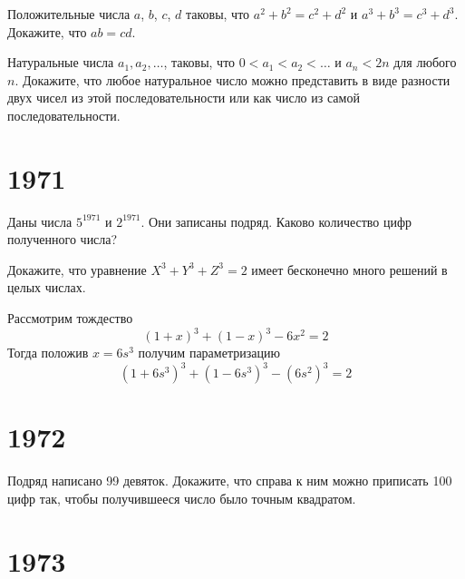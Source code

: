 \documentclass[11pt, a4paper]{common/document_template}
\begin{document}
\begin{exercise}[22]
Положительные числа $a$, $b$, $c$, $d$ таковы, что $a^{2} + b^{2} = c^{2} + d^{2}$ и $a^{3} + b^{3} = c^{3} + d^{3}$. Докажите, что $ab = cd$.
\end{exercise}

\begin{Solution}

\end{Solution}


\begin{exercise}[34]
Натуральные числа $a_{1}, a_{2}, \dots$, таковы, что $0 < a_{1} < a_{2} < \dots$ и $a_{n} < 2n$ для любого $n$. Докажите, что любое натуральное число можно представить в виде разности двух чисел из этой последовательности или как число из самой последовательности.
\end{exercise}

\chapter{1971}

\begin{exercise}[14]
Даны числа $5^{1971}$ и $2^{1971}$. Они записаны подряд. Каково количество цифр полученного числа?
\end{exercise}

\begin{exercise}[37]
Докажите, что уравнение $X^{3} + Y^{3} + Z^{3} = 2$ имеет бесконечно много решений в целых числах.
\end{exercise}

\begin{Solution}
Рассмотрим тождество
$$
(1+x)^{3} + (1-x)^{3} - 6x^{2} = 2
$$
Тогда положив $x = 6s^{3}$ получим параметризацию
$$
(1+6s^{3})^{3} + (1-6s^{3})^{3} - (6s^{2})^{3} = 2
$$ 
\end{Solution}

\chapter{1972}

\begin{exercise}[33]
Подряд написано 99 девяток. Докажите, что справа к ним можно приписать 100 цифр так, чтобы получившееся число было точным квадратом.
\end{exercise}


\chapter{1973}
\end{document}
